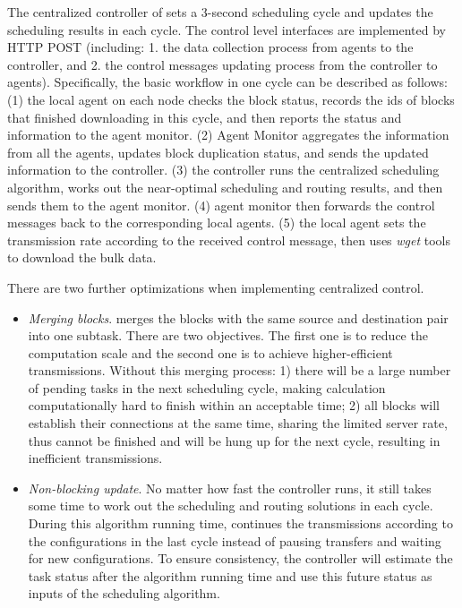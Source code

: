 The centralized controller of \name sets a 3-second scheduling cycle and updates the scheduling results in each cycle. The control level interfaces are implemented by HTTP POST (including: 1. the data collection process from agents to the controller, and 2. the control messages updating process from the controller to agents). Specifically, the basic workflow in one cycle can be described as follows: (1) the local agent on each node checks the block status, records the ids of blocks that finished downloading in this cycle, and then reports the status and information to the agent monitor. (2) Agent Monitor aggregates the information from all the agents, updates block duplication status, and sends the updated information to the controller. (3) the controller runs the centralized scheduling algorithm, works out the near-optimal scheduling and routing results, and then sends them to the agent monitor. (4) agent monitor then forwards the control messages back to the corresponding local agents. (5) the local agent sets the transmission rate according to the received control message, then uses \emph{wget} tools to download the bulk data.

There are two further optimizations when implementing centralized control.
\begin{itemize}
\item \emph{Merging blocks}. \name merges the blocks with the same source and destination pair into one subtask. There are two objectives. The first one is to reduce the computation scale and the second one is to achieve higher-efficient transmissions. Without this merging process: 1) there will be a large number of pending tasks in the next scheduling cycle, making calculation computationally hard to finish within an acceptable time; 2) all blocks will establish their connections at the same time, sharing the limited server rate, thus cannot be finished and will be hung up for the next cycle, resulting in inefficient transmissions.
\item \emph{Non-blocking update}. No matter how fast the controller runs, it still takes some time to work out the scheduling and routing solutions in each cycle. During this algorithm running time, \name continues the transmissions according to the configurations in the last cycle instead of pausing transfers and waiting for new configurations. To ensure consistency, the controller will estimate the task status after the algorithm running time and use this future status as inputs of the scheduling algorithm.
\end{itemize}

